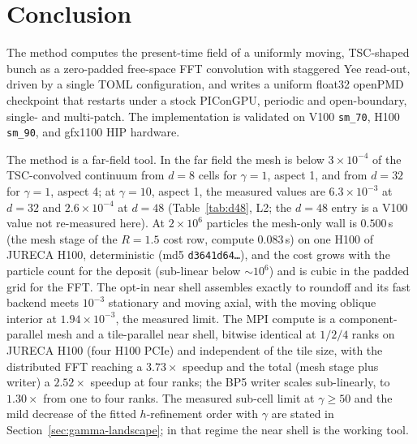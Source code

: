 \section{Conclusion}
\label{sec:conclusion}

The method computes the present-time field of a
uniformly moving, TSC-shaped bunch as a zero-padded free-space FFT
convolution with staggered Yee read-out, driven by a single TOML
configuration, and writes a uniform float32 openPMD checkpoint that restarts
under a stock PIConGPU, periodic and open-boundary, single- and multi-patch.
The implementation is validated on V100 \texttt{sm\_70}, H100
\texttt{sm\_90}, and gfx1100 HIP hardware.

The method is a far-field tool. In the far field the mesh is below
$3\times10^{-4}$ of the TSC-convolved continuum from $d=8$ cells for
$\gamma=1$, aspect 1, and from $d=32$ for $\gamma=1$, aspect 4; at
$\gamma=10$, aspect 1, the measured values are $6.3\times10^{-3}$ at
$d=32$ and $2.6\times10^{-4}$ at $d=48$ (Table~\ref{tab:d48}, L2; the
$d=48$ entry is a V100 value not re-measured here). At
$2\times10^{6}$ particles the mesh-only wall is $0.500$\,s (the mesh stage
of the $R=1.5$ cost row, compute $0.083$\,s) on one H100 of
JURECA H100,
deterministic (md5 \texttt{d3641d64\ldots}), and the cost grows with the
particle count for the deposit (sub-linear below $\sim10^6$) and is cubic in
the padded grid for the FFT.
The opt-in near shell assembles exactly to roundoff and its fast backend
meets $10^{-3}$ stationary and moving axial, with the moving oblique
interior at $1.94\times10^{-3}$, the measured limit. The MPI compute is a
component-parallel mesh and a tile-parallel near shell, bitwise identical
at $1/2/4$ ranks on JURECA H100 (four H100 PCIe) and independent of the tile size, with the
distributed FFT reaching a $3.73\times$ speedup and the total (mesh stage
plus writer) a $2.52\times$ speedup at four ranks; the BP5 writer scales
sub-linearly, to $1.30\times$ from one to four ranks. The measured sub-cell
limit at $\gamma\ge50$ and the mild decrease of the fitted $h$-refinement
order with $\gamma$ are stated in
Section~\ref{sec:gamma-landscape}; in that regime the near shell is the
working tool.

